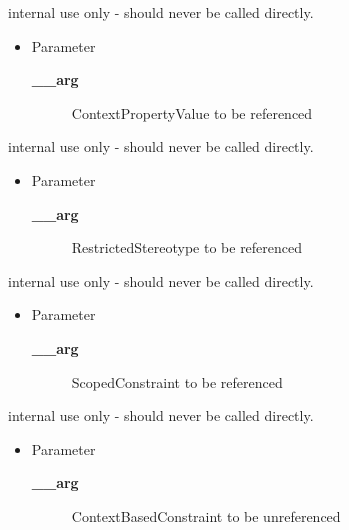 \begin{desc}internal use only - should never be called directly.
\begin{itemize}
\item{Parameter
  \begin{description}
   \item[{\bf \_\_arg}]{ContextPropertyValue to be referenced}
  \end{description}}
\end{itemize}
\end{desc}

\begin{desc}internal use only - should never be called directly.
\begin{itemize}
\item{Parameter
  \begin{description}
   \item[{\bf \_\_arg}]{RestrictedStereotype to be referenced}
  \end{description}}
\end{itemize}
\end{desc}

\begin{desc}internal use only - should never be called directly.
\begin{itemize}
\item{Parameter
  \begin{description}
   \item[{\bf \_\_arg}]{ScopedConstraint to be referenced}
  \end{description}}
\end{itemize}
\end{desc}

\begin{desc}internal use only - should never be called directly.
\begin{itemize}
\item{Parameter
  \begin{description}
   \item[{\bf \_\_arg}]{ContextBasedConstraint to be unreferenced}
  \end{description}}
\end{itemize}
\end{desc}

